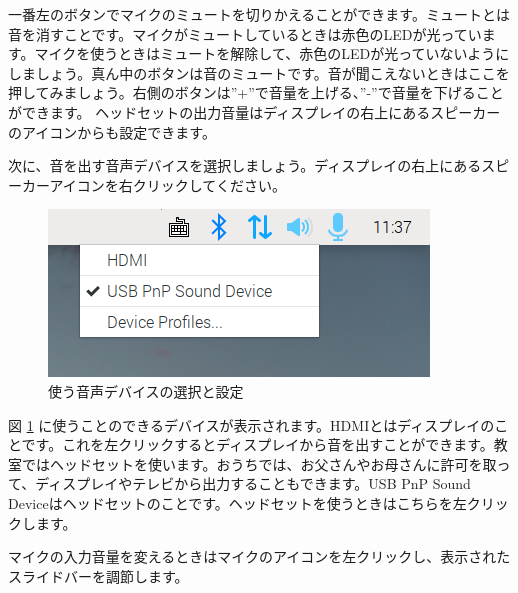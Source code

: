 一番左のボタンでマイクのミュートを切りかえることができます。ミュートとは音を消すことです。マイクがミュートしているときは赤色のLEDが光っています。マイクを使うときはミュートを解除して、赤色のLEDが光っていないようにしましょう。真ん中のボタンは音のミュートです。音が聞こえないときはここを押してみましょう。右側のボタンは”+”で音量を上げる、”-”で音量を下げることができます。
ヘッドセットの出力音量はディスプレイの右上にあるスピーカーのアイコンからも設定できます。

次に、音を出す音声デバイスを選択しましょう。ディスプレイの右上にあるスピーカーアイコンを右クリックしてください。

\begin{figure}[H]
\begin{center}
    \includegraphics[width=\linewidth]{images/select_sink.png}
    \caption{使う音声デバイスの選択と設定}
    \label{使う音声デバイスの選択と設定}
\end{center}
\end{figure}

図 \ref{使う音声デバイスの選択と設定} に使うことのできるデバイスが表示されます。HDMIとはディスプレイのことです。これを左クリックするとディスプレイから音を出すことができます。教室ではヘッドセットを使います。おうちでは、お父さんやお母さんに許可を取って、ディスプレイやテレビから出力することもできます。USB PnP Sound Deviceはヘッドセットのことです。ヘッドセットを使うときはこちらを左クリックします。

マイクの入力音量を変えるときはマイクのアイコンを左クリックし、表示されたスライドバーを調節します。

